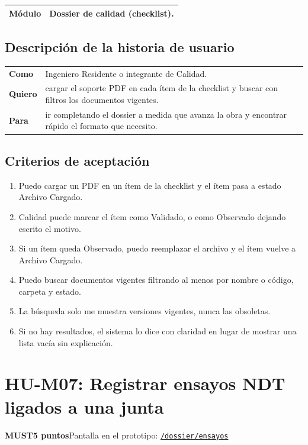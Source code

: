 \documentclass[11pt]{article}
\newcommand{\urlapp}{https://thankstochatgpt.github.io/LOARD}
\newcommand{\app}[1]{\href{\urlapp#1}{\texttt{#1}}}
\newcommand{\etiqueta}[1]{\colorbox{barra}{\textbf{\color{marca}#1}}}
\begin{document}
\begin{tabular}{>{\bfseries}p{2.4cm} p{13.4cm}}
\toprule
Módulo & Dossier de calidad (checklist). \\
\bottomrule
\end{tabular}

\subsection*{Descripción de la historia de usuario}

\begin{tabular}{>{\bfseries}p{2.4cm} p{13.4cm}}
\toprule
Como & Ingeniero Residente o integrante de Calidad. \\
Quiero & cargar el soporte PDF en cada ítem de la checklist y buscar con filtros los documentos vigentes. \\
Para & ir completando el dossier a medida que avanza la obra y encontrar rápido el formato que necesito. \\
\bottomrule
\end{tabular}

\subsection*{Criterios de aceptación}

\begin{enumerate}
\item Puedo cargar un PDF en un ítem de la checklist y el ítem pasa a estado Archivo Cargado.
\item Calidad puede marcar el ítem como Validado, o como Observado dejando escrito el motivo.
\item Si un ítem queda Observado, puedo reemplazar el archivo y el ítem vuelve a Archivo Cargado.
\item Puedo buscar documentos vigentes filtrando al menos por nombre o código, carpeta y estado.
\item La búsqueda solo me muestra versiones vigentes, nunca las obsoletas.
\item Si no hay resultados, el sistema lo dice con claridad en lugar de mostrar una lista vacía sin explicación.
\end{enumerate}


\newpage
\section*{HU-M07: Registrar ensayos NDT ligados a una junta}
\etiqueta{MUST}\quad\etiqueta{5 puntos}\quad Pantalla en el prototipo: \app{/dossier/ensayos}
\end{document}
